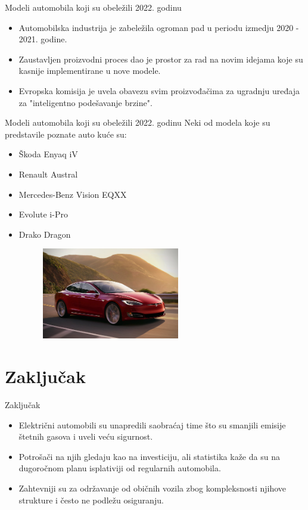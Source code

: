 \documentclass[11pt]{beamer}
\begin{document}
\begin{frame}{Modeli automobila koji su obeležili 2022. godinu}{\thesection \, \secname}

\begin{itemize}
\item Automobilska industrija je zabeležila ogroman pad u periodu izmedju 2020 - 2021. godine.
\item Zaustavljen proizvodni proces dao je prostor za rad na novim idejama koje su kasnije implementirane u nove modele.
\item Evropska komisija je uvela obavezu svim proizvođačima za ugradnju uređaja za "inteligentno podešavanje brzine".
\end{itemize}
\end{frame}

\begin{frame}{Modeli automobila koji su obeležili 2022. godinu}
Neki od modela koje su predstavile poznate auto kuće su:
\begin{itemize}
\item Škoda Enyaq iV
\item Renault Austral
\item Mercedes-Benz Vision EQXX
\item Evolute i-Pro
\item Drako Dragon

\begin{figure}[h]
        \centering
        \includegraphics[width=60mm, scale=0.5]{tesla.jpeg}
        \label{fig:tesla.jpeg}
        \end{figure}

\end{itemize}

\end{frame}

\section{Zaključak}

\begin{frame}{Zaključak}
\begin{itemize}
\item Električni automobili su unapredili saobraćaj time što su smanjili emisije štetnih gasova i uveli veću sigurnost.
\item Potrošači na njih gledaju kao na investiciju, ali statistika kaže da su na dugoročnom planu isplativiji od regularnih automobila.
\item Zahtevniji su za održavanje od običnih vozila zbog kompleksnosti njihove strukture i često ne podležu osiguranju.
\end{itemize}

\end{frame}
\end{document}
